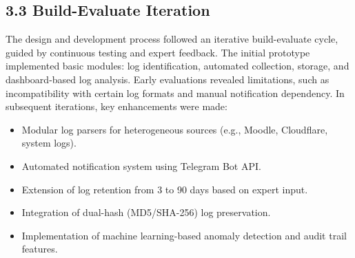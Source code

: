 \subsection{3.3 Build-Evaluate Iteration}

The design and development process followed an iterative build-evaluate cycle, guided by continuous testing and expert feedback. The initial prototype implemented basic modules: log identification, automated collection, storage, and dashboard-based log analysis. Early evaluations revealed limitations, such as incompatibility with certain log formats and manual notification dependency. In subsequent iterations, key enhancements were made:
\begin{itemize}
	\item Modular log parsers for heterogeneous sources (e.g., Moodle, Cloudflare, system logs).
	\item Automated notification system using Telegram Bot API.
	\item Extension of log retention from 3 to 90 days based on expert input.
	\item Integration of dual-hash (MD5/SHA-256) log preservation.
	\item Implementation of machine learning-based anomaly detection and audit trail features.
\end{itemize}

